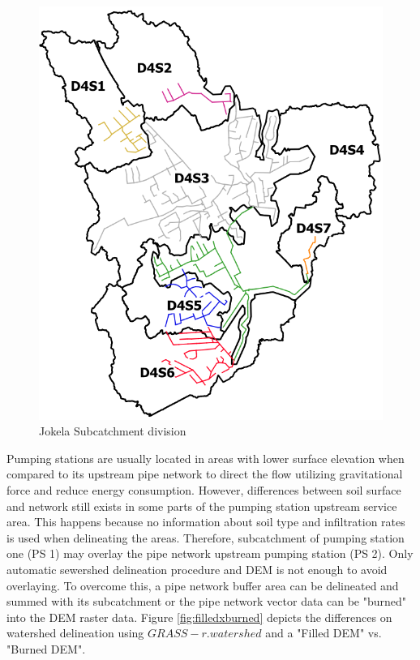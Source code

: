 \begin{figure}[h]
    \centering
	\includegraphics[scale=0.6]{figures/subcatchments.png}
	\caption{Jokela Subcatchment division}
	\label{fig:subcatchments}
\end{figure}



Pumping stations are usually located in areas with lower surface elevation when compared to its upstream pipe network to direct the flow utilizing gravitational force and reduce energy consumption. However, differences between soil surface and network still exists in some parts of the pumping station upstream service area. This happens because no information about soil type and infiltration rates is used when delineating the areas. Therefore, subcatchment of pumping station one (PS 1) may overlay the pipe network upstream pumping station (PS 2). Only automatic sewershed delineation procedure and DEM is not enough to avoid overlaying. To overcome this, a pipe network buffer area can be delineated and summed with its subcatchment or the pipe network vector data can be "burned" into the DEM raster data. Figure \ref{fig:filledxburned} depicts the differences on watershed delineation using $GRASS - r.watershed$ and a "Filled DEM" vs. "Burned DEM".

